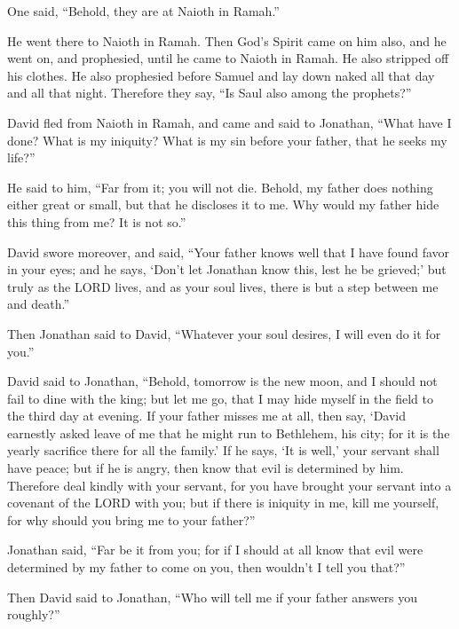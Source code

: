 One said, “Behold, they are at Naioth in Ramah.”

\myverse{}He went there to Naioth in Ramah. Then God’s Spirit came on
him also, and he went on, and prophesied, until he came to Naioth in Ramah.
\myverse{}He also stripped off his clothes. He also prophesied before Samuel and lay
down naked all that day and all that night. Therefore they say, “Is Saul also among the prophets?”


\mychapter{} \myverse*{}David fled from Naioth in Ramah, and came and said to Jonathan,
“What have I done? What is my iniquity? What is my sin before your father, that he seeks my life?”

\myverse{}He said to him, “Far from it; you will not die. Behold, my father
does nothing either great or small, but that he discloses it to me. Why would my father hide this thing
from me? It is not so.”

\myverse{}David swore moreover, and said, “Your father knows well that I
have found favor in your eyes; and he says, ‘Don’t let Jonathan know this, lest he be grieved;’ but truly
as the LORD lives, and as your soul lives, there is but a step between me and death.”

\myverse{}Then Jonathan said to David, “Whatever your soul desires, I will
even do it for you.”

\myverse{}David said to Jonathan, “Behold, tomorrow is the new moon, and
I should not fail to dine with the king; but let me go, that I may hide myself in the field to the third
day at evening.
\myverse{}If your father misses me at all, then say, ‘David earnestly asked leave of
me that he might run to Bethlehem, his city; for it is the yearly sacrifice there for all the family.’
\myverse{}If he says, ‘It is well,’ your servant shall have peace; but if he is angry,
then know that evil is determined by him.
\myverse{}Therefore deal kindly with your servant, for you have brought your servant
into a covenant of the LORD with you; but if there is iniquity in me, kill me yourself, for why should
you bring me to your father?”

\myverse{}Jonathan said, “Far be it from you; for if I should at all know
that evil were determined by my father to come on you, then wouldn’t I tell you that?”

\myverse{}Then David said to Jonathan, “Who will tell me if your father
answers you roughly?”

